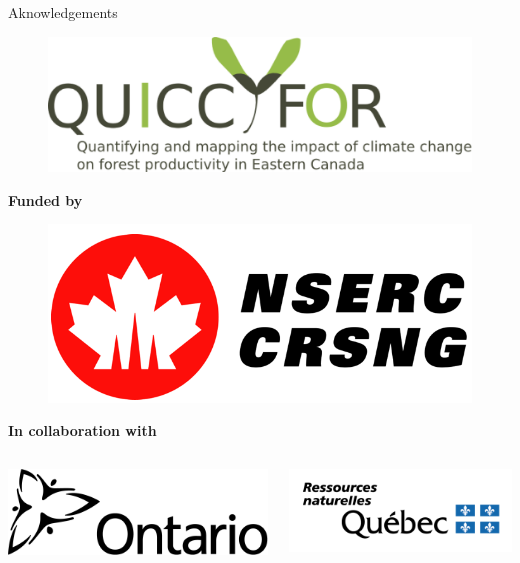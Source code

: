 \documentclass[10pt,aspectratio=149]{beamer}
\begin{document}
\begin{frame}[t]{Aknowledgements}
\vspace{-1em}
\begin{center}
		\begin{figure}
			\includegraphics[width=0.3\paperwidth]{logo.png}
		\end{figure}
		\vfill
		\centering \small{\textbf{Funded by}}
		\vfill
		\begin{figure}
			\includegraphics[width=0.2\paperwidth]{nserc.png}
		\end{figure}
		\vfill
		\centering \small{\textbf{In collaboration with}}
		\vfill
\begin{columns}[t]
	\begin{column}{0.19\linewidth}
		\includegraphics[width=0.15\paperwidth]{Figs/logo/logo_11_ORMN.png}
	\end{column}
	\begin{column}{0.19\linewidth}
		\includegraphics[width=0.15\paperwidth]{Figs/logo/logo_12_MRN.png}

\end{column}
\end{columns}
\end{center}
\end{frame}
\end{document}
